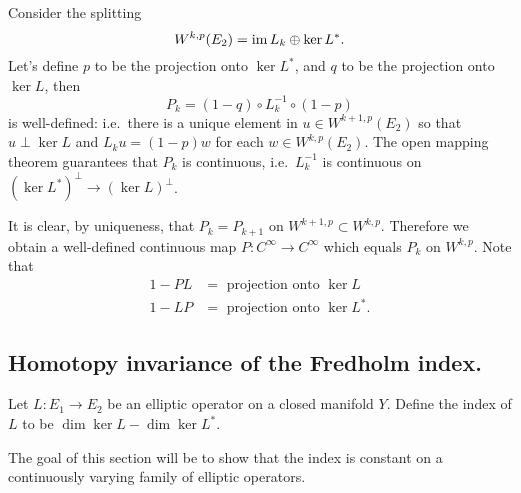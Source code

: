 \documentclass{amsart}
\begin{document}
  \begin{example}
   Consider the splitting
   \begin{equation*}
     W^{k,p}(E_{2})=\operatorname{\mathrm{im}} L_{k}\oplus \ker L^{*}.
   \end{equation*}
   Let's define $p$ to be the projection onto $\ker L^{*}$, and $q$
   to be the projection onto $\ker L$, then
   \begin{equation*}
     P_{k}=(1-q)\circ L_{k}^{-1}\circ (1-p)
   \end{equation*}
   is well-defined: i.e.\ there is a unique element in
   $u\in W^{k+1,p}(E_{2})$ so that $u\perp \ker L$ and $L_{k}u=(1-p)w$
   for each $w\in W^{k,p}(E_{2})$. The open mapping theorem guarantees
   that $P_{k}$ is continuous, i.e.\ $L_{k}^{-1}$ is continuous on
   $(\ker L^{*})^{\perp}\to (\ker L)^{\perp}$.

   It is clear, by uniqueness, that $P_{k}=P_{k+1}$ on $W^{k+1,p}\subset
   W^{k,p}$. Therefore we obtain a well-defined continuous map
   $P:C^{\infty}\to C^{\infty}$ which equals $P_{k}$ on
   $W^{k,p}$. Note that
   \begin{equation*}
     \begin{aligned}
       1-PL&=\text{ projection onto $\ker L$}\\
       1-LP&=\text{ projection onto $\ker L^{*}$}.
     \end{aligned}
   \end{equation*}
 \end{example}
 \subsection*{Homotopy invariance of the Fredholm index.}
 Let $L:E_{1}\to E_{2}$ be an elliptic operator on a closed manifold
 $Y$. Define the index of $L$ to be $\dim \ker L-\dim \ker L^{*}$.

 The goal of this section will be to show that the index is
 constant on a continuously varying family of elliptic operators.
\end{document}
